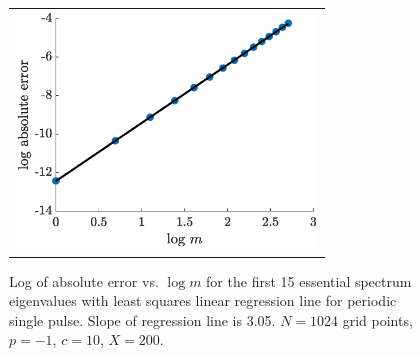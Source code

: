 \documentclass[12pt]{elsarticle}
\theoremstyle{plain}
\theoremstyle{definition}
\theoremstyle{remark}
\numberwithin{theorem}{section}
\numberwithin{equation}{section}
\begin{document}
\begin{figure}
\begin{center}
\begin{tabular}{c}
\includegraphics[width=8cm]{images/SPesslogerror.eps}
\end{tabular}
\end{center}
\caption{Log of absolute error vs. $\log m$ for the first 15 essential spectrum eigenvalues with least squares linear regression line for periodic single pulse. Slope of regression line is 3.05. $N = 1024$ grid points, $p = -1$, $c = 10$, $X = 200$.}
\label{fig:DP2esslogerror}
\end{figure}
\end{document}
